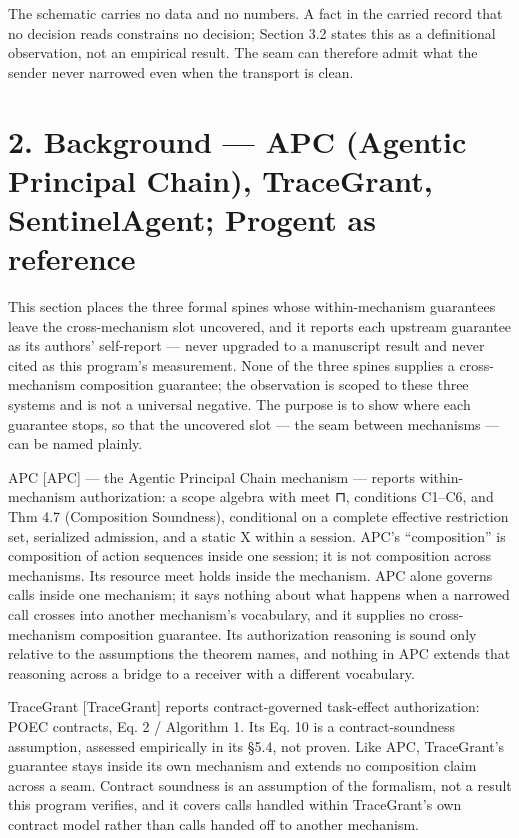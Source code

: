 \documentclass[
  10pt,
]{article}
\renewcommand{\_}{\allowbreak\origunderscore}
\begin{document}
The schematic carries no data and no numbers. A fact in the carried
record that no decision reads constrains no decision; Section 3.2 states
this as a definitional observation, not an empirical result. The seam
can therefore admit what the sender never narrowed even when the
transport is clean.

\section{2. Background --- APC (Agentic Principal Chain), TraceGrant,
SentinelAgent; Progent as
reference}\label{background-apc-agentic-principal-chain-tracegrant-sentinelagent-progent-as-reference}

This section places the three formal spines whose within-mechanism
guarantees leave the cross-mechanism slot uncovered, and it reports each
upstream guarantee as its authors' self-report --- never upgraded to a
manuscript result and never cited as this program's measurement. None of
the three spines supplies a cross-mechanism composition guarantee; the
observation is scoped to these three systems and is not a universal
negative. The purpose is to show where each guarantee stops, so that the
uncovered slot --- the seam between mechanisms --- can be named plainly.

APC {[}APC{]} --- the Agentic Principal Chain mechanism --- reports
within-mechanism authorization: a scope algebra with meet ⊓, conditions
C1--C6, and Thm 4.7 (Composition Soundness), conditional on a complete
effective restriction set, serialized admission, and a static X within a
session. APC's ``composition'' is composition of action sequences inside
one session; it is not composition across mechanisms. Its resource meet
holds inside the mechanism. APC alone governs calls inside one
mechanism; it says nothing about what happens when a narrowed call
crosses into another mechanism's vocabulary, and it supplies no
cross-mechanism composition guarantee. Its authorization reasoning is
sound only relative to the assumptions the theorem names, and nothing in
APC extends that reasoning across a bridge to a receiver with a
different vocabulary.

TraceGrant {[}TraceGrant{]} reports contract-governed task-effect
authorization: POEC contracts, Eq. 2 / Algorithm 1. Its Eq. 10 is a
contract-soundness assumption, assessed empirically in its §5.4, not
proven. Like APC, TraceGrant's guarantee stays inside its own mechanism
and extends no composition claim across a seam. Contract soundness is an
assumption of the formalism, not a result this program verifies, and it
covers calls handled within TraceGrant's own contract model rather than
calls handed off to another mechanism.
\end{document}
